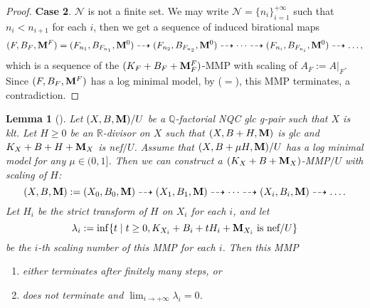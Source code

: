 \documentclass[11pt]{amsart}
\numberwithin{equation}{section}
\newcommand{\Mm}{{\bf{M}}}
\newcommand{\Qq}{\mathbb{Q}}
\newcommand{\Rr}{\mathbb{R}}
\newtheorem{lem}[thm]{Lemma}
\theoremstyle{definition}
\theoremstyle{definition}
\theoremstyle{definition}
\begin{document}
\begin{proof}
\medskip

\noindent\textbf{Case 2}. $\mathcal{N}$ is not a finite set. We may write $\mathcal{N}=\{n_i\}_{i=1}^{+\infty}$ such that $n_i<n_{i+1}$ for each $i$, then we get a sequence of induced birational maps
$$(F,B_F,\Mm^F)=(F_{n_1},B_{F_{n_1}},\Mm^0)\dashrightarrow (F_{n_2},B_{F_{n_2}},\Mm^0)\dashrightarrow\dots\dashrightarrow (F_{n_i},B_{F_{n_i}},\Mm^0)\dashrightarrow\dots,$$
which is a sequence of the $(K_{F}+B_F+\Mm^F_F)$-MMP with scaling of $A_F:=A|_F$. Since $(F,B_F,\Mm^F)$ has a log minimal model, by \cite[Theorem 2.8]{HL21} ($=$\cite[Version 3,Theorem 2.24]{HL21}), this MMP terminates, a contradiction.
\end{proof}


\begin{lem}[{\cite[Version 2, Lemma 2.43]{HL21}}]\label{lem: gmmp scaling numbers go to 0}
Let $(X,B,\Mm)/U$ be a $\Qq$-factorial NQC glc g-pair such that $X$ is klt. Let $H\geq 0$ be an $\Rr$-divisor on $X$ such that $(X,B+H,\Mm)$ is glc and $K_X+B+H+\Mm_X$ is nef$/U$. Assume that $(X,B+\mu H,\Mm)/U$ has a log minimal model for any $\mu\in (0,1]$. Then we can construct a $(K_X+B+\Mm_X)$-MMP$/U$ with scaling of $H$:
$$(X,B,\Mm):=(X_0,B_0,\Mm)\dashrightarrow (X_1,B_1,\Mm)\dashrightarrow\dots\dashrightarrow (X_i,B_i,\Mm)\dashrightarrow\dots.$$
Let $H_i$ be the strict transform of $H$ on $X_i$ for each $i$, and let
$$\lambda_i:=\inf\{t\mid t\geq 0, K_{X_i}+B_i+tH_i+\Mm_{X_i}\text{ is nef/}U\}$$
be the $i$-th scaling number of this MMP for each $i$. Then this MMP
\begin{enumerate}
    \item either terminates after finitely many steps, or
    \item does not terminate and $\lim_{i\rightarrow+\infty}\lambda_i=0$.
\end{enumerate}
\end{lem}
\end{document}
